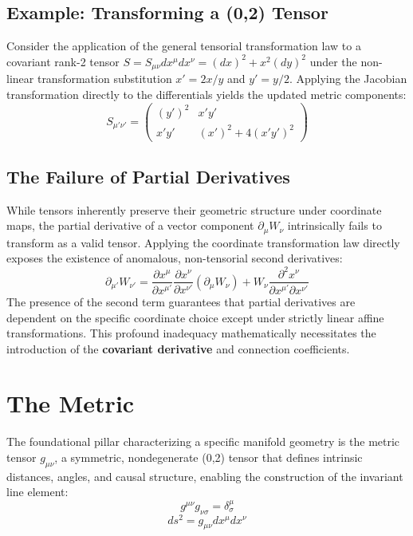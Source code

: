 \documentclass[11pt, a4paper]{report}
\begin{document}
\subsection*{Example: Transforming a (0,2) Tensor}
Consider the application of the general tensorial transformation law to a covariant rank-2 tensor $S = S_{\mu\nu} dx^\mu dx^\nu = (dx)^2 + x^2 (dy)^2$ under the non-linear transformation substitution $x' = 2x/y$ and $y' = y/2$. Applying the Jacobian transformation directly to the differentials yields the updated metric components:
\begin{equation} \label{S_transform} S_{\mu'\nu'} = \begin{pmatrix} (y')^2 & x'y' \\ x'y' & (x')^2 + 4(x'y')^2 \end{pmatrix} \end{equation}

\subsection*{The Failure of Partial Derivatives}
While tensors inherently preserve their geometric structure under coordinate maps, the partial derivative of a vector component $\partial_\mu W_\nu$ intrinsically fails to transform as a valid tensor. Applying the coordinate transformation law directly exposes the existence of anomalous, non-tensorial second derivatives:
\begin{equation} \partial_{\mu'} W_{\nu'} = \frac{\partial x^\mu}{\partial x^{\mu'}} \frac{\partial x^\nu}{\partial x^{\nu'}} (\partial_\mu W_\nu) + W_\nu \frac{\partial^2 x^\nu}{\partial x^{\mu'} \partial x^{\nu'}} \end{equation}
The presence of the second term guarantees that partial derivatives are dependent on the specific coordinate choice except under strictly linear affine transformations. This profound inadequacy mathematically necessitates the introduction of the \textbf{covariant derivative} and connection coefficients.

\section{The Metric}
The foundational pillar characterizing a specific manifold geometry is the metric tensor $g_{\mu\nu}$, a symmetric, nondegenerate (0,2) tensor that defines intrinsic distances, angles, and causal structure, enabling the construction of the invariant line element:
\begin{equation} g^{\mu\nu} g_{\nu\sigma} = \delta^\mu_\sigma \end{equation}
\begin{equation} ds^2 = g_{\mu\nu} dx^\mu dx^\nu \end{equation}
\end{document}
